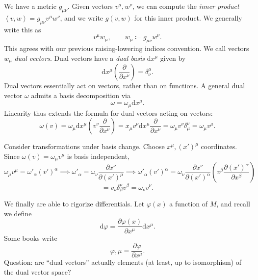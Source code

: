 We have a metric $g_{\mu \nu } $. Given vectors $v^\mu ,w^\nu $, we can compute the \emph{inner product} $\left\langle v,w \right\rangle =g_{\mu \nu } v^\mu w^\nu $, and we write $g(v,w)$ for this inner product. We generally write this as
\[
	v^\mu w_\mu  ,\qquad w_\mu \coloneqq g_{\mu \nu } w^\nu 
.\]
This agrees with our previous raising-lowering indices convention. We call vectors $w_\mu $ \emph{dual vectors}. Dual vectors have a \emph{dual basis} $\mathrm{d} x^\mu $ given by
\[
	\mathrm{d} x^\mu \left(\frac{\partial }{\partial x^\nu } \right)=\delta _\nu ^\mu 
.\]
Dual vectors essentially act on vectors, rather than on functions. A general dual vector $\omega $ admits a basis decomposition via
\[
	\omega =\omega _\mu \mathrm{d} x^\mu
.\]
Linearity thus extends the formula for dual vectors acting on vectors:
\[
	\omega (v)=\omega _\mu \mathrm{d} x^\mu \left( v^\nu \frac{\partial }{\partial x^\nu }  \right) =x_\mu v^\nu \mathrm{d} x^\mu \frac{\partial }{\partial x^\nu } =\omega _\mu v^\nu \delta _\mu ^\nu =\omega _\mu v^\mu 
.\]

Consider transformations under basis change. Choose $x^\mu ,(x')^\mu $ coordinates. Since $\omega (v)=\omega _\mu v^\mu $ is basis independent,
\[
	\omega_\mu v^\mu =\omega '_\alpha (v')^\alpha \implies \omega '_\alpha =\omega _\nu \frac{\partial x^\nu }{\partial (x')^\mu } \implies \omega '_\alpha (v')^\alpha =\omega _\nu \frac{\partial x^\nu }{\partial (x')^\alpha } \left( v^\beta \frac{\partial (x')^\alpha }{\partial x^\beta }  \right) 
\]
\[
	=v_\nu \delta _\beta ^\nu v^\beta =\omega _\nu v^\nu 
.\]

We finally are able to rigorize differentials. Let $\varphi (x)$ a function of $M$, and recall we define
\[
	\mathrm{d} \varphi =\frac{\partial \varphi (x)}{\partial x^\mu } \mathrm{d} x^\mu 
.\]
Some books write
\[
	\varphi ,\mu =\frac{\partial \varphi }{\partial x^\mu } 
.\]
Question: are ``dual vectors'' actually elements (at least, up to isomorphism) of the dual vector space?
